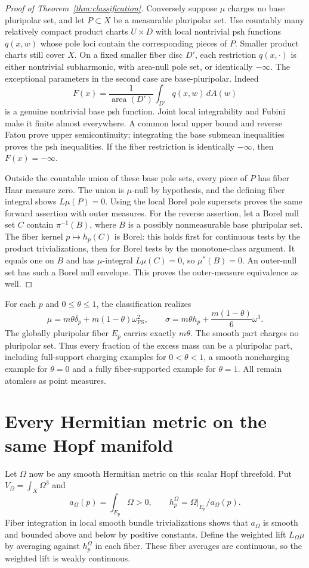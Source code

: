 \documentclass[11pt]{article}
\begin{document}
\begin{proof}[Proof of Theorem~\ref{thm:classification}]
Conversely suppose $\mu$ charges no base pluripolar set, and let
$P\subset X$ be a measurable pluripolar set. Use countably many
relatively compact product charts $U\times D$ with local nontrivial
psh functions $q(x,w)$ whose pole loci contain the corresponding
pieces of $P$. Smaller product charts still cover $X$. On a fixed
smaller fiber disc $D'$, each restriction $q(x,\cdot)$ is either
nontrivial subharmonic, with area-null pole set, or identically
$-\infty$. The exceptional parameters in the second case are
base-pluripolar. Indeed
\[
 F(x)=\frac1{\operatorname{area}(D')}
                   \int_{D'}q(x,w)\,dA(w)
\]
is a genuine nontrivial base psh function. Joint local integrability
and Fubini make it finite almost everywhere. A common local upper
bound and reverse Fatou prove upper semicontinuity; integrating the
base submean inequalities proves the psh inequalities. If the fiber
restriction is identically $-\infty$, then $F(x)=-\infty$.

Outside the countable union of these base pole sets, every piece of
$P$ has fiber Haar measure zero. The union is $\mu$-null by
hypothesis, and the defining fiber integral shows $L\mu(P)=0$.
Using the local Borel pole supersets proves the same forward assertion
with outer measures. For the reverse assertion, let a Borel null set
$C$ contain $\pi^{-1}(B)$, where $B$ is a possibly nonmeasurable base
pluripolar set. The fiber kernel $p\mapsto h_p(C)$ is Borel: this holds
first for continuous tests by the product trivializations, then for
Borel tests by the monotone-class argument. It equals one on $B$ and
has $\mu$-integral $L\mu(C)=0$, so $\mu^*(B)=0$.
An outer-null set has such a Borel null envelope. This proves the
outer-measure equivalence as well.
\end{proof}

For each $p$ and $0\leq\theta\leq1$, the classification realizes
\[
 \mu=m\theta\delta_p+m(1-\theta)\omega_{\mathrm{FS}}^2,
 \qquad
 \sigma=m\theta h_p+\frac{m(1-\theta)}6\omega^3.
\]
The globally pluripolar fiber $E_p$ carries exactly $m\theta$.
The smooth part charges no pluripolar set. Thus every fraction of
the excess mass can be a pluripolar part, including full-support
charging examples for $0<\theta<1$, a smooth noncharging example
for $\theta=0$ and a fully fiber-supported example for $\theta=1$.
All remain atomless as point measures.

\section{Every Hermitian metric on the same Hopf manifold}
Let $\Omega$ now be any smooth Hermitian metric on this scalar
Hopf threefold. Put $V_\Omega=\int_X\Omega^3$ and
\[
 a_\Omega(p)=\int_{E_p}\Omega>0,\qquad
 h_p^\Omega=\Omega|_{E_p}/a_\Omega(p).
\]
Fiber integration in local smooth bundle trivializations shows that
$a_\Omega$ is smooth and bounded above and below by positive constants.
Define the weighted lift $L_\Omega\mu$ by averaging against
$h_p^\Omega$ in each fiber. These fiber averages are continuous,
so the weighted lift is weakly continuous.
\end{document}
